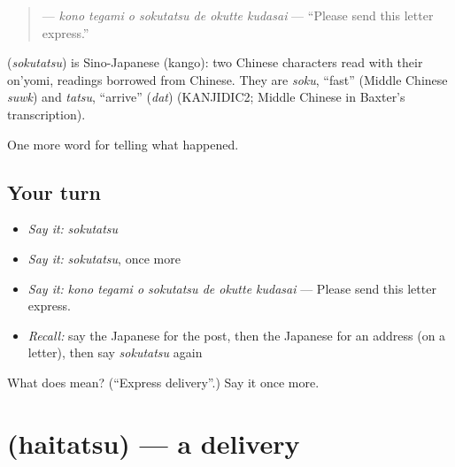 \begin{quote}
\textbf{    } — \emph{kono tegami o sokutatsu de okutte kudasai} — \textquotedblleft{}Please send this letter express.\textquotedblright{}
\end{quote}

\begin{cousinweb}
\textbf{} (\emph{sokutatsu}) is Sino-Japanese (kango): two Chinese characters read with their on'yomi, readings borrowed from Chinese. They are \emph{soku}, \textquotedblleft{}fast\textquotedblright{} (Middle Chinese \emph{suwk}) and \emph{tatsu}, \textquotedblleft{}arrive\textquotedblright{} (\emph{dat}) (KANJIDIC2; Middle Chinese in Baxter's transcription).
\end{cousinweb}

\begin{grammarlens}[title={What you've built}]
One more word for telling what happened.
\end{grammarlens}

\subsection*{Your turn}
\begin{itemize}
\raggedright
  \item \emph{Say it:} \emph{sokutatsu}
  \item \emph{Say it:} \emph{sokutatsu}, once more
  \item \emph{Say it:} \emph{kono tegami o sokutatsu de okutte kudasai} — Please send this letter express.
  \item \emph{Recall:} say the Japanese for the post, then the Japanese for an address (on a letter), then say \emph{sokutatsu} again
\end{itemize}

\begin{tcolorbox}[breakable,colback=teal!4,colframe=teal!35!black,title={Before you move on}]
What does  mean? (\textquotedblleft{}Express delivery\textquotedblright{}.) Say it once more.
\end{tcolorbox}
\section[\texorpdfstring{\ja{はいたつ} (haitatsu)}{はいたつ (haitatsu)}]{ (haitatsu) — a delivery}

\label{lesson:JA-C305-haitatsu}




